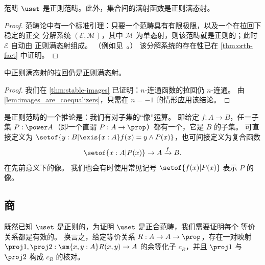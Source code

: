 
\begin{thm}\label{thm:set_regular}\label{lem:images_are_coequalizers}
范畴 $\uset$ 是正则范畴。此外，集合间的满射函数是正则满态射。
\end{thm}

\begin{proof}
范畴论中有一个标准引理：只要一个范畴具有有限极限，以及一个在拉回下稳定的正交
分解系统 $(\mathcal{E},\mathcal{M})$，其中 $\mathcal{M}$ 为单态射，则该范畴就是正则的；此时 $\mathcal{E}$ 自动由
正则满态射组成。
（例如见~\cite[A1.3.4]{elephant}。）
该分解系统的存在性已在 \cref{thm:orth-fact} 中证明。
\end{proof}

\begin{lem}\label{lem:pb_of_coeq_is_coeq}
\uset 中正则满态射的拉回仍是正则满态射。
\end{lem}
\begin{proof}
  我们在 \cref{thm:stable-images} 已证明：$n$-连通函数的拉回仍 $n$-连通。
  由 \cref{lem:images_are_coequalizers}，只需在 $n=-1$ 的情形应用该结论。
\end{proof}

\uset 是正则范畴的一个推论是：我们有对子集的“像”运算。
即给定 $f:A\to B$，任一子集 $P:\power A$（即一个直谓 $P:A\to \prop$）都有一个，它是 $B$ 的子集。
可直接定义为 $\setof{ y:B | \exis{x:A} f(x)=y \land P(x)}$，也可间接定义为复合函数
\[ \setof{ x:A | P(x) } \to A \xrightarrow{f} B.\]
在先前意义下的像。
我们也会有时使用常见记号 $\setof{f(x) | P(x)}$ 表示 $P$ 的像。


\subsection{商}\label{subsec:quotients}

%
既然已知 $\uset$ 是正则的，为证明 $\uset$ 是正合范畴，我们需要证明每个
等价关系都是有效的。
%
%
换言之，给定等价关系
$R:A\to A\to\prop$，存在一对映射
$\proj1,\proj2:\sm{x,y:A} R(x,y)\to A$ 的余等化子 $c_R$，并且 $\proj1$ 与 $\proj2$
构成 $c_R$ 的核对。

